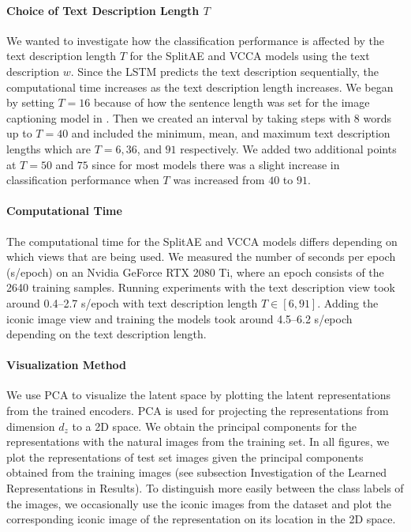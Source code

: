\paragraph{Choice of Text Description Length $T$} We wanted to investigate how the classification performance is affected by the text description length $T$ for the SplitAE and VCCA models using the text description $w$. Since the LSTM predicts the text description sequentially, the computational time increases as the text description length increases. We began by setting $T = 16$ because of how the sentence length was set for the image captioning model in . Then we created an interval by taking steps with 8 words up to $T=40$ and included the minimum, mean, and maximum text description lengths which are $T=6, 36$, and $91$ respectively. We added two additional points at $T=50$ and $75$ since for most models there was a slight increase in classification performance when $T$ was increased from $40$ to $91$. 

\paragraph{Computational Time} The computational time for the SplitAE and VCCA models differs depending on which views that are being used. We measured the number of seconds per epoch (s/epoch) on an Nvidia GeForce RTX 2080 Ti, where an epoch consists of the 2640 training samples. Running experiments with the text description view 
took around 0.4--2.7 s/epoch with text description length $T \in [6, 91]$. Adding the iconic image view and training the models 
took around 4.5--6.2 s/epoch depending on the text description length.


\paragraph{Visualization Method} We use PCA to visualize the latent space by plotting the latent representations from the trained encoders. PCA is used for projecting the representations from dimension $d_{z}$ to a 2D space. We obtain the principal components for the representations with the natural images from the training set. In all figures, we plot the representations of test set images given the principal components obtained from the training images (see subsection Investigation of the Learned Representations in Results). To distinguish more easily between the class labels of the images, we occasionally use the iconic images from the dataset and plot the corresponding iconic image of the representation on its location in the 2D space.

